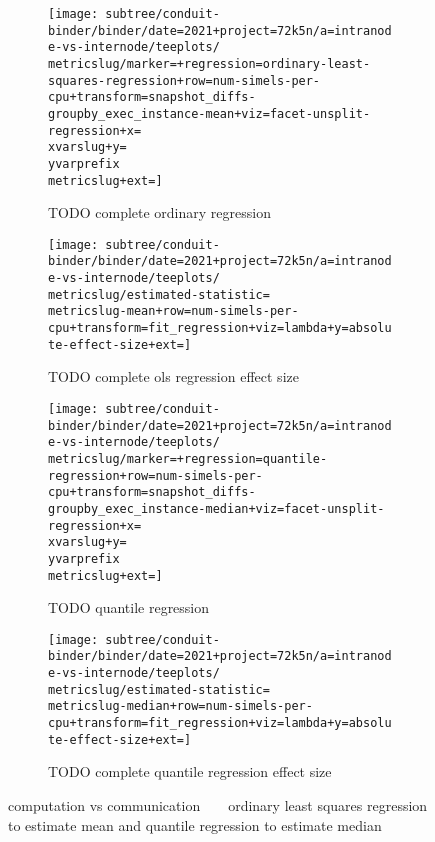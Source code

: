 \begin{figure*}
  \centering

  \begin{subfigure}[b]{0.5\textwidth}
    \centering
    \texttt{[image: subtree/conduit-binder/binder/date=2021+project=72k5n/a=intranode-vs-internode/teeplots/\\metricslug/marker=+regression=ordinary-least-squares-regression+row=num-simels-per-cpu+transform=snapshot\_diffs-groupby\_exec\_instance-mean+viz=facet-unsplit-regression+x=\\xvarslug+y=\\yvarprefix\\metricslug+ext=]}
    \caption{TODO complete ordinary regression}
    \label{fig:intranode-vs-internode-regression-ols-\metricslug-complete-regression}
  \end{subfigure}%
  \begin{subfigure}[b]{0.5\textwidth}
    \centering
    \texttt{[image: subtree/conduit-binder/binder/date=2021+project=72k5n/a=intranode-vs-internode/teeplots/\\metricslug/estimated-statistic=\\metricslug-mean+row=num-simels-per-cpu+transform=fit\_regression+viz=lambda+y=absolute-effect-size+ext=]}
    \caption{TODO complete ols regression effect size}
    \label{fig:intranode-vs-internode-regression-ols-\metricslug-complete-effect-size}
  \end{subfigure}

  \begin{subfigure}[b]{0.5\textwidth}
    \centering
    \texttt{[image: subtree/conduit-binder/binder/date=2021+project=72k5n/a=intranode-vs-internode/teeplots/\\metricslug/marker=+regression=quantile-regression+row=num-simels-per-cpu+transform=snapshot\_diffs-groupby\_exec\_instance-median+viz=facet-unsplit-regression+x=\\xvarslug+y=\\yvarprefix\\metricslug+ext=]}
    \caption{TODO quantile regression}
    \label{fig:intranode-vs-internode-regression-quantile-\metricslug-complete-regression}
  \end{subfigure}%
  \begin{subfigure}[b]{0.5\textwidth}
    \centering
    \texttt{[image: subtree/conduit-binder/binder/date=2021+project=72k5n/a=intranode-vs-internode/teeplots/\\metricslug/estimated-statistic=\\metricslug-median+row=num-simels-per-cpu+transform=fit\_regression+viz=lambda+y=absolute-effect-size+ext=]}
    \caption{TODO complete quantile regression effect size}
    \label{fig:intranode-vs-internode-regression-quantile-\metricslug-complete-effect-size}
  \end{subfigure}

  \caption{computation vs communication ~ \metric ~ ordinary least squares regression to estimate mean and quantile regression to estimate median}
  \label{fig:intranode-vs-internode-regression-\metricslug}
\end{figure*}
